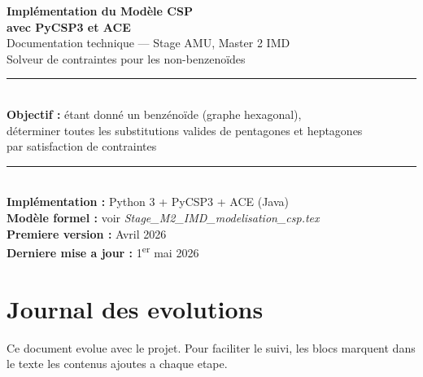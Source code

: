 \documentclass[12pt,a4paper]{article}
\theoremstyle{definition}
\begin{document}
\begin{titlepage}
  \centering
  \vspace*{2cm}
  {\huge\bfseries\color{primary}
    Implémentation du Modèle CSP\\[0.4em]
    avec PyCSP3 et ACE\\[1em]}
  {\large\color{gray} Documentation technique — Stage AMU, Master 2 IMD}\\[0.5em]
  {\large\color{gray} Solveur de contraintes pour les non-benzenoïdes}\\[3em]
  \rule{\linewidth}{0.5pt}\\[1em]
  {\large
    \textbf{Objectif :} étant donné un benzénoïde (graphe hexagonal),\\
    déterminer toutes les substitutions valides de pentagones et heptagones\\
    par satisfaction de contraintes
  }\\[1em]
  \rule{\linewidth}{0.5pt}\\[3em]
  {\normalsize
    \textbf{Implémentation :} Python 3 + PyCSP3 + ACE (Java)\\[0.5em]
    \textbf{Modèle formel :} voir \textit{Stage\_M2\_IMD\_modelisation\_csp.tex}\\[0.5em]
    \textbf{Premiere version :} Avril 2026\\[0.3em]
    \textbf{Derniere mise a jour :} 1\textsuperscript{er} mai 2026
  }
  \vfill
\end{titlepage}

\tableofcontents
\newpage

\section*{Journal des evolutions}

Ce document evolue avec le projet. Pour faciliter le suivi, les blocs
marquent dans le texte les contenus ajoutes a chaque etape.
\end{document}
